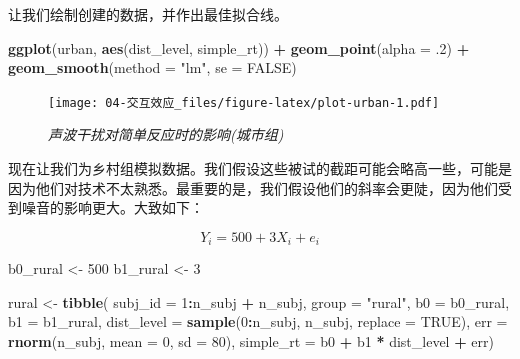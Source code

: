 \documentclass[
]{book}
\newenvironment{Shaded}{\begin{snugshade}}{\end{snugshade}}
\newcommand{\AttributeTok}[1]{\textcolor[rgb]{0.13,0.29,0.53}{#1}}
\newcommand{\ConstantTok}[1]{\textcolor[rgb]{0.56,0.35,0.01}{#1}}
\newcommand{\DecValTok}[1]{\textcolor[rgb]{0.00,0.00,0.81}{#1}}
\newcommand{\FunctionTok}[1]{\textcolor[rgb]{0.13,0.29,0.53}{\textbf{#1}}}
\newcommand{\NormalTok}[1]{#1}
\newcommand{\OtherTok}[1]{\textcolor[rgb]{0.56,0.35,0.01}{#1}}
\newcommand{\SpecialCharTok}[1]{\textcolor[rgb]{0.81,0.36,0.00}{\textbf{#1}}}
\newcommand{\StringTok}[1]{\textcolor[rgb]{0.31,0.60,0.02}{#1}}
\begin{document}
让我们绘制创建的数据，并作出最佳拟合线。

\begin{Shaded}
\begin{Highlighting}[]
\FunctionTok{ggplot}\NormalTok{(urban, }\FunctionTok{aes}\NormalTok{(dist\_level, simple\_rt)) }\SpecialCharTok{+} 
  \FunctionTok{geom\_point}\NormalTok{(}\AttributeTok{alpha =}\NormalTok{ .}\DecValTok{2}\NormalTok{) }\SpecialCharTok{+}
  \FunctionTok{geom\_smooth}\NormalTok{(}\AttributeTok{method =} \StringTok{"lm"}\NormalTok{, }\AttributeTok{se =} \ConstantTok{FALSE}\NormalTok{)}
\end{Highlighting}
\end{Shaded}

\begin{figure}
\centering
\texttt{[image: 04-交互效应\_files/figure-latex/plot-urban-1.pdf]}
\caption{\label{fig:plot-urban}\emph{声波干扰对简单反应时的影响(城市组)}}
\end{figure}

现在让我们为乡村组模拟数据。我们假设这些被试的截距可能会略高一些，可能是因为他们对技术不太熟悉。最重要的是，我们假设他们的斜率会更陡，因为他们受到噪音的影响更大。大致如下：

\[Y_i = 500 + 3 X_i + e_i\]

\begin{Shaded}
\begin{Highlighting}[]
\NormalTok{b0\_rural }\OtherTok{\textless{}{-}} \DecValTok{500}
\NormalTok{b1\_rural }\OtherTok{\textless{}{-}} \DecValTok{3}

\NormalTok{rural }\OtherTok{\textless{}{-}} \FunctionTok{tibble}\NormalTok{(}
  \AttributeTok{subj\_id =} \DecValTok{1}\SpecialCharTok{:}\NormalTok{n\_subj }\SpecialCharTok{+}\NormalTok{ n\_subj,}
  \AttributeTok{group =} \StringTok{"rural"}\NormalTok{,}
  \AttributeTok{b0 =}\NormalTok{ b0\_rural,}
  \AttributeTok{b1 =}\NormalTok{ b1\_rural,}
  \AttributeTok{dist\_level =} \FunctionTok{sample}\NormalTok{(}\DecValTok{0}\SpecialCharTok{:}\NormalTok{n\_subj, n\_subj, }\AttributeTok{replace =} \ConstantTok{TRUE}\NormalTok{),}
  \AttributeTok{err =} \FunctionTok{rnorm}\NormalTok{(n\_subj, }\AttributeTok{mean =} \DecValTok{0}\NormalTok{, }\AttributeTok{sd =} \DecValTok{80}\NormalTok{),}
  \AttributeTok{simple\_rt =}\NormalTok{ b0 }\SpecialCharTok{+}\NormalTok{ b1 }\SpecialCharTok{*}\NormalTok{ dist\_level }\SpecialCharTok{+}\NormalTok{ err)}
\end{Highlighting}
\end{Shaded}
\end{document}
